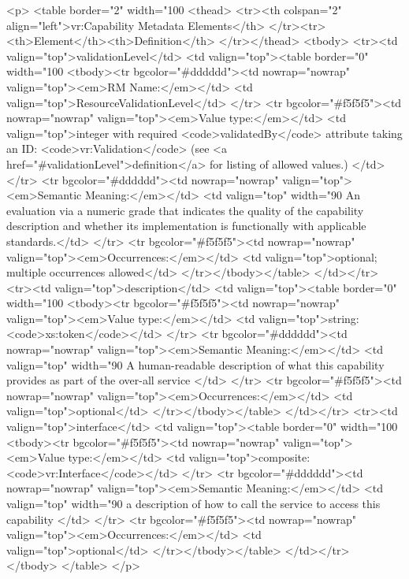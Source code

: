 \documentclass[11pt,a4paper]{ivoa}
\begin{document}
<p>
<table border="2" width="100%
<thead>
  <tr><th colspan="2" align="left">vr:Capability Metadata Elements</th>
  </tr><tr><th>Element</th><th>Definition</th>
</tr></thead>
<tbody>
  <tr><td valign="top">validationLevel</td>
      <td valign="top"><table border="0" width="100%
          <tbody><tr bgcolor="#dddddd"><td nowrap="nowrap" valign="top"><em>RM Name:</em></td>
              <td valign="top">ResourceValidationLevel</td>
          </tr>
          <tr bgcolor="#f5f5f5"><td nowrap="nowrap" valign="top"><em>Value type:</em></td>
              <td valign="top">integer with required <code>validatedBy</code>
                  attribute taking an ID: <code>vr:Validation</code>
                  (see <a href="#validationLevel">definition</a> for
                  listing of allowed values.) </td>
          </tr>
          <tr bgcolor="#dddddd"><td nowrap="nowrap" valign="top"><em>Semantic Meaning:</em></td>
              <td valign="top" width="90%
                  An evaluation via a numeric grade that indicates the
                  quality of the capability description and whether
                  its implementation is functionally with applicable
                  standards.</td>  
          </tr>
          <tr bgcolor="#f5f5f5"><td nowrap="nowrap" valign="top"><em>Occurrences:</em></td>
              <td valign="top">optional; multiple occurrences allowed</td>
          </tr></tbody></table>
      </td></tr>
  <tr><td valign="top">description</td>
      <td valign="top"><table border="0" width="100%
          <tbody><tr bgcolor="#f5f5f5"><td nowrap="nowrap" valign="top"><em>Value type:</em></td>
              <td valign="top">string: <code>xs:token</code></td>
          </tr>
          <tr bgcolor="#dddddd"><td nowrap="nowrap" valign="top"><em>Semantic Meaning:</em></td>
              <td valign="top" width="90%
                 A human-readable description of what this capability 
                 provides as part of the over-all service
              </td>
          </tr>
          <tr bgcolor="#f5f5f5"><td nowrap="nowrap" valign="top"><em>Occurrences:</em></td>
              <td valign="top">optional</td>
          </tr></tbody></table>
      </td></tr>
  <tr><td valign="top">interface</td>
      <td valign="top"><table border="0" width="100%
          <tbody><tr bgcolor="#f5f5f5"><td nowrap="nowrap" valign="top"><em>Value type:</em></td>
              <td valign="top">composite: <code>vr:Interface</code></td>
          </tr>
          <tr bgcolor="#dddddd"><td nowrap="nowrap" valign="top"><em>Semantic Meaning:</em></td>
              <td valign="top" width="90%
                 a description of how to call the service to access
                 this capability
              </td>
          </tr>
          <tr bgcolor="#f5f5f5"><td nowrap="nowrap" valign="top"><em>Occurrences:</em></td>
              <td valign="top">optional</td>
          </tr></tbody></table>
      </td></tr>
</tbody>
</table>
</p>
\end{document}
